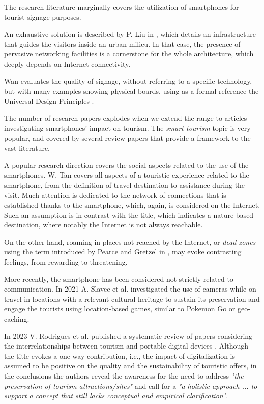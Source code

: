 \documentclass[sustainability,article,submit,pdftex,moreauthors]{Definitions/mdpi}
\begin{document}
The research literature marginally covers the utilization of smartphones for tourist signage purposes.

An exhaustive solution is described by P. Liu in \cite{liu16a}, which details an infrastructure that guides the visitors inside an urban milieu. In that case, the presence of pervasive networking facilities is a cornerstone for the whole architecture, which deeply depends on Internet connectivity. 

Wan \cite{wan22a} evaluates the quality of signage, without referring to a specific technology, but with many examples showing physical boards, using as a formal reference the Universal Design Principles \cite{udi97a}.


The number of research papers explodes when we extend the range to articles investigating smartphones' impact on tourism. The {\em smart tourism} topic is very popular, and covered by several review papers that provide a framework to the vast literature.

A popular research direction covers the social aspects related to the use of the smartphones. W. Tan \cite{tan17a} covers all aspects of a touristic experience related to the smartphone, from the definition of travel destination to assistance during the visit. Much attention is dedicated to the network of connections that is established thanks to the smartphone, which, again, is considered on the Internet. Such an assumption is in contrast with the title, which indicates a nature-based destination, where notably the Internet is not always reachable.

On the other hand, roaming in places not reached by the Internet, or {\em dead zones} using the term introduced by Pearce and Gretzel in \cite{pea12a}, may evoke contrasting feelings, from rewarding to threatening.

More recently, the smartphone has been considered not strictly related to communication. In 2021 A. Slavec et al. investigated the use of cameras \cite{sla21a} while on travel in locations with a relevant cultural heritage to sustain its preservation and engage the tourists using location-based games, similar to Pokemon Go or geo-caching.

In 2023 V. Rodrigues et al. published a systematic review of papers considering the interrelationships between tourism and portable digital devices \cite{rod23a}. Although the title evokes a one-way contribution, i.e., the impact of digitalization is assumed to be positive on the quality and the sustainability of touristic offers, in the conclusions the authors reveal the awareness for the need to address {\em "the preservation of tourism attractions/sites"} and call for a {\em "a holistic approach ... to support a concept that still lacks conceptual and empirical clarification"}.
\end{document}
